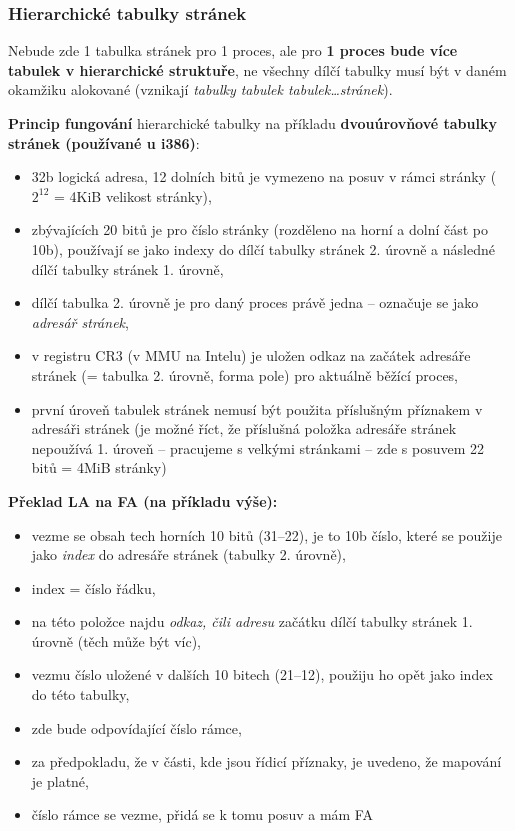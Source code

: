 \documentclass[a4paper, 11pt]{article}
\begin{document}
\subsubsection{Hierarchické tabulky stránek}
Nebude zde 1 tabulka stránek pro 1 proces, ale pro \textbf{1 proces bude více tabulek v hierarchické struktuře}, ne všechny dílčí tabulky musí být v daném okamžiku alokované (vznikají \textit{tabulky tabulek tabulek\ldots stránek}).
 
\textbf{Princip fungování} hierarchické tabulky na příkladu \textbf{dvouúrovňové tabulky stránek (používané u i386)}:
\begin{itemize}
    \item 32b logická adresa, 12 dolních bitů je vymezeno na posuv v rámci stránky ($2^{12}$ = 4KiB velikost stránky),
    \item zbývajících 20 bitů je pro číslo stránky (rozděleno na horní a dolní část po 10b), používají se jako indexy do dílčí tabulky stránek 2. úrovně a následné dílčí tabulky stránek 1. úrovně,
    \item dílčí tabulka 2. úrovně je pro daný proces právě jedna -- označuje se jako \emph{adresář stránek},
    \item v registru CR3 (v MMU na Intelu) je uložen odkaz na začátek adresáře stránek (= tabulka 2. úrovně, forma pole) pro aktuálně běžící proces,
    \item první úroveň tabulek stránek nemusí být použita příslušným příznakem v adresáři stránek (je možné říct, že příslušná položka adresáře stránek nepoužívá 1. úroveň -- pracujeme s velkými stránkami -- zde s posuvem 22 bitů = 4MiB stránky)
\end{itemize}

\textbf{Překlad LA na FA (na příkladu výše):}
\begin{itemize}
    \item vezme se obsah tech horních 10 bitů (31--22), je to 10b číslo, které se použije jako \emph{index} do adresáře stránek (tabulky 2. úrovně),
    \item index = číslo řádku,
    \item na této položce najdu \emph{odkaz, čili adresu} začátku dílčí tabulky stránek 1. úrovně (těch může být víc),
    \item vezmu číslo uložené v dalších 10 bitech (21--12), použiju ho opět jako index do této tabulky,
    \item zde bude odpovídající číslo rámce,
    \item za předpokladu, že v části, kde jsou řídicí příznaky, je uvedeno, že mapování je platné,
    \item číslo rámce se vezme, přidá se k tomu posuv a mám FA
\end{itemize}
\end{document}
